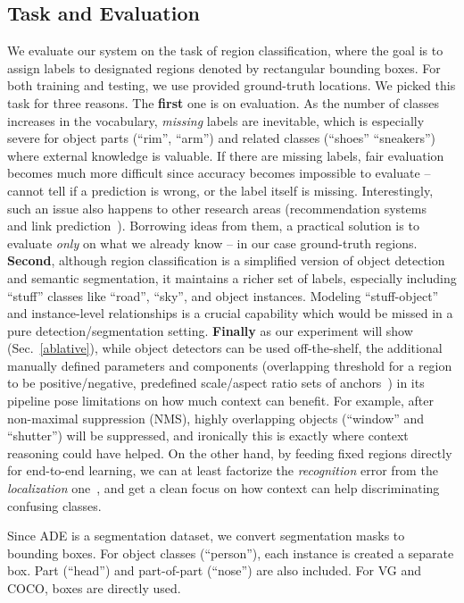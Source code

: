 \documentclass[10pt,twocolumn,letterpaper]{article}
\begin{document}
\subsection{Task and Evaluation\label{task}}
We evaluate our system on the task of region classification, where the goal is to assign labels to designated regions denoted by rectangular bounding boxes. For both training and testing, we use provided ground-truth locations. We picked this task for three reasons. The {\bf first} one is on evaluation. As the number of classes increases in the vocabulary, \emph{missing} labels are inevitable, which is especially severe for object parts (\eg ``rim'', ``arm'') and related classes (\eg ``shoes'' \vs ``sneakers'') where external knowledge is valuable. If there are missing labels, fair evaluation becomes much more difficult since accuracy becomes impossible to evaluate -- cannot tell if a prediction is wrong, or the label itself is missing. Interestingly, such an issue also happens to other research areas (\eg recommendation systems~\cite{sarwar2001item} and link prediction~\cite{liben2007link}). Borrowing ideas from them, a practical solution is to evaluate \emph{only} on what we already know -- in our case ground-truth regions. {\bf Second}, although region classification is a simplified version of object detection and semantic segmentation, it maintains a richer set of labels, especially including ``stuff'' classes like ``road'', ``sky'', and object instances. Modeling ``stuff-object'' and instance-level relationships is a crucial capability which would be missed in a pure detection/segmentation setting. {\bf Finally} as our experiment will show (Sec.~\ref{ablative}), while object detectors can be used off-the-shelf, the additional manually defined parameters and components (\eg overlapping threshold for a region to be positive/negative, predefined scale/aspect ratio sets of anchors~\cite{ren2015faster}) in its pipeline pose limitations on how much context can benefit. For example, after non-maximal suppression (NMS), highly overlapping objects (\eg ``window'' and ``shutter'') will be suppressed, and ironically this is exactly where context reasoning could have helped. On the other hand, by feeding fixed regions directly for end-to-end learning, we can at least factorize the \emph{recognition} error from the \emph{localization} one~\cite{hoiem2012diagnosing}, and get a clean focus on how context can help discriminating confusing classes.

Since ADE is a segmentation dataset, we convert segmentation masks to bounding boxes. For object classes (\eg ``person''), each instance is created a separate box. Part (\eg ``head'') and part-of-part (\eg ``nose'') are also included. For VG and COCO, boxes are directly used.
\end{document}
